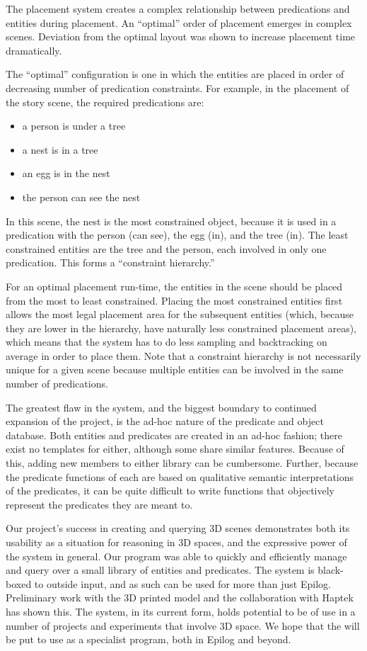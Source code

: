 The placement system creates a complex relationship between predications and entities during placement. An ``optimal'' order of placement emerges in complex scenes. Deviation from the optimal layout was shown to increase placement time dramatically.

The ``optimal'' configuration is one in which the entities are placed in order of decreasing number of predication constraints. For example, in the placement of the story scene, the required predications are:
\begin{center}
	\begin{itemize}
		\item a person is under a tree
		\item a nest is in a tree
		\item an egg is in the nest
		\item the person can see the nest
	\end{itemize}
\end{center} 
In this scene, the nest is the most constrained object, because it is used in a predication with the person (can see), the egg (in), and the tree (in). The least constrained entities are the tree and the person, each involved in only one predication. This forms a ``constraint hierarchy.'' 

For an optimal placement run-time, the entities in the scene should be placed from the most to least constrained. Placing the most constrained entities first allows the most legal placement area for the subsequent entities (which, because they are lower in the hierarchy, have naturally less constrained placement areas), which means that the system has to do less sampling and backtracking on average in order to place them.
Note that a constraint hierarchy is not necessarily unique for a given scene because multiple entities can be involved in the same number of predications.

The greatest flaw in the system, and the biggest boundary to continued expansion of the project, is the ad-hoc nature of the predicate and object database. 
Both entities and predicates are created in an ad-hoc fashion; there exist no templates for either, although some share similar features. 
Because of this, adding new members to either library can be cumbersome. 
Further, because the predicate functions of each are based on qualitative semantic interpretations of the predicates, it can be quite difficult to write functions that objectively represent the predicates they are meant to.

Our project's success in creating and querying 3D scenes demonstrates both its usability as a situation for reasoning in 3D spaces, and the expressive power of the system in general. 
Our program was able to quickly and efficiently manage and query over a small library of entities and predicates. 
The system is black-boxed to outside input, and as such can be used for more than just Epilog. Preliminary work with the 3D printed model and the collaboration with Haptek has shown this. The system, in its current form, holds potential to be of use in a number of projects and experiments that involve 3D space. We hope that the \TDS will be put to use as a specialist program, both in Epilog and beyond.